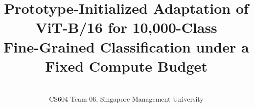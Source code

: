 \documentclass[10pt,twocolumn,letterpaper]{article}
\title{Prototype-Initialized Adaptation of ViT-B/16 for 10,000-Class\\Fine-Grained Classification under a Fixed Compute Budget}
\author{\todo{Member 1 (student ID)} \qquad \todo{Member 2 (student ID)} \qquad \todo{Member 3 (student ID)}\\
CS604 Team 06, Singapore Management University\\
{\tt\small \todo{email addresses}}
}
\begin{document}
\maketitle






{
    \small
    
    
}


\end{document}
